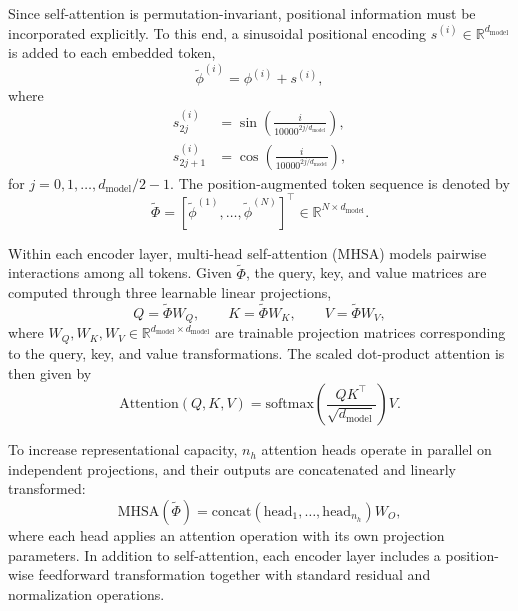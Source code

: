 \documentclass[journal]{IEEEtran}
\begin{document}
Since self-attention is permutation-invariant, positional information must be incorporated explicitly. To this end, a sinusoidal positional encoding $s^{(i)} \in \mathbb{R}^{d_{\mathrm{model}}}$ is added to each embedded token,
\begin{equation}
    \tilde{\phi}^{(i)} = \phi^{(i)} + s^{(i)},
\end{equation}
where
\begin{equation}
\begin{split}
    s^{(i)}_{2j} &= \sin\!\left(\frac{i}{10000^{2j/d_{\mathrm{model}}}}\right), \\
    s^{(i)}_{2j+1} &= \cos\!\left(\frac{i}{10000^{2j/d_{\mathrm{model}}}}\right),
\end{split}
\label{eq:pos_enc}
\end{equation}
for $j = 0,1,\ldots,d_{\mathrm{model}}/2-1$. The position-augmented token sequence is denoted by
\begin{equation}
    \widetilde{\Phi}
    =
    [\tilde{\phi}^{(1)}, \ldots, \tilde{\phi}^{(N)}]^\top
    \in \mathbb{R}^{N \times d_{\mathrm{model}}}.
\end{equation}

Within each encoder layer, multi-head self-attention (MHSA) models pairwise interactions among all tokens. Given $\widetilde{\Phi}$, the query, key, and value matrices are computed through three learnable linear projections,
\begin{equation}
    Q = \widetilde{\Phi}W_Q, \qquad
    K = \widetilde{\Phi}W_K, \qquad
    V = \widetilde{\Phi}W_V,
    \label{eq:qkv}
\end{equation}
where $W_Q, W_K, W_V \in \mathbb{R}^{d_{\mathrm{model}} \times d_{\mathrm{model}}}$ are trainable projection matrices corresponding to the query, key, and value transformations. The scaled dot-product attention is then given by
\begin{equation}
    \mathrm{Attention}(Q,K,V)
    =
    \mathrm{softmax}\!\left(\frac{QK^\top}{\sqrt{d_{\mathrm{model}}}}\right)V.
    \label{eq:attention}
\end{equation}

To increase representational capacity, $n_h$ attention heads operate in parallel on independent projections, and their outputs are concatenated and linearly transformed:
\begin{equation}
    \mathrm{MHSA}(\widetilde{\Phi})
    =
    \mathrm{concat}(\mathrm{head}_1,\ldots,\mathrm{head}_{n_h})W_O,
    \label{eq:mhsa}
\end{equation}
where each head applies an attention operation with its own projection parameters. In addition to self-attention, each encoder layer includes a position-wise feedforward transformation together with standard residual and normalization operations.
\end{document}
